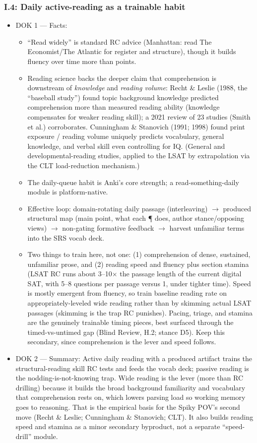 \documentclass[11pt]{article}
\begin{document}
\subsubsection*{I.4: Daily active-reading as a trainable habit}
\begin{itemize}
\item DOK 1 --- Facts:
\begin{itemize}
\item \enquote{Read widely} is standard RC advice (Manhattan: read The Economist/The Atlantic for register and structure), though it builds fluency over time more than points.
\item Reading science backs the deeper claim that comprehension is downstream of \textit{knowledge} and \textit{reading volume}: Recht \& Leslie (1988, the \enquote{baseball study}) found topic background knowledge predicted comprehension more than measured reading ability (knowledge compensates for weaker reading skill); a 2021 review of 23 studies (Smith et al.) corroborates. Cunningham \& Stanovich (1991; 1998) found print exposure / reading volume uniquely predicts vocabulary, general knowledge, and verbal skill even controlling for IQ. (General and developmental-reading studies, applied to the LSAT by extrapolation via the CLT load-reduction mechanism.)
\item The daily-queue habit is Anki's core strength; a read-something-daily module is platform-native.
\item Effective loop: domain-rotating daily passage (interleaving) $\rightarrow$ produced structural map (main point, what each \P{} does, author stance/opposing views) $\rightarrow$ non-gating formative feedback $\rightarrow$ harvest unfamiliar terms into the SRS vocab deck.
\item Two things to train here, not one: (1) comprehension of dense, sustained, unfamiliar prose, and (2) reading speed and fluency plus section stamina (LSAT RC runs about 3--10$\times$ the passage length of the current digital SAT, with 5--8 questions per passage versus 1, under tighter time). Speed is mostly emergent from fluency, so train baseline reading rate on appropriately-leveled wide reading rather than by skimming actual LSAT passages (skimming is the trap RC punishes). Pacing, triage, and stamina are the genuinely trainable timing pieces, best surfaced through the timed-vs-untimed gap (Blind Review, H.2; stance D5). Keep this secondary, since comprehension is the lever and speed follows.
\end{itemize}
\item DOK 2 --- Summary: Active daily reading with a produced artifact trains the structural-reading skill RC tests and feeds the vocab deck; passive reading is the nodding-is-not-knowing trap. Wide reading is the lever (more than RC drilling) because it builds the broad background familiarity and vocabulary that comprehension rests on, which lowers parsing load so working memory goes to reasoning. That is the empirical basis for the Spiky POV's second move (Recht \& Leslie; Cunningham \& Stanovich; CLT). It also builds reading speed and stamina as a minor secondary byproduct, not a separate \enquote{speed-drill} module.
\end{itemize}
\end{document}
